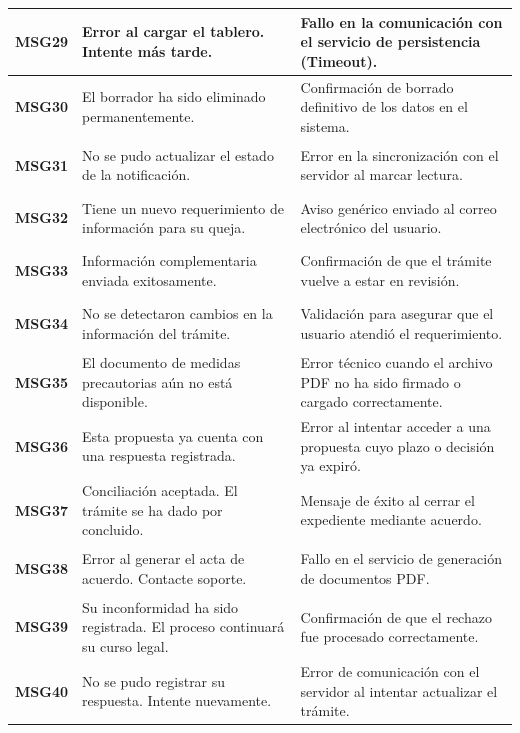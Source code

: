 \begin{longtable}{|p{2cm}|p{6cm}|p{6cm}|}
    \hypertarget{msg:MSG29}{\textbf{MSG29}} & Error al cargar el tablero. Intente más tarde. & Fallo en la comunicación con el servicio de persistencia (Timeout). \\ \hline
    \hypertarget{msg:MSG30}{\textbf{MSG30}} & El borrador ha sido eliminado permanentemente. & Confirmación de borrado definitivo de los datos en el sistema. \\ \hline
    \hypertarget{msg:MSG31}{\textbf{MSG31}} & No se pudo actualizar el estado de la notificación. & Error en la sincronización con el servidor al marcar lectura. \\ \hline
    \hypertarget{msg:MSG32}{\textbf{MSG32}} & Tiene un nuevo requerimiento de información para su queja. & Aviso genérico enviado al correo electrónico del usuario. \\ \hline
    \hypertarget{msg:MSG33}{\textbf{MSG33}} & Información complementaria enviada exitosamente. & Confirmación de que el trámite vuelve a estar en revisión. \\ \hline
    \hypertarget{msg:MSG34}{\textbf{MSG34}} & No se detectaron cambios en la información del trámite. & Validación para asegurar que el usuario atendió el requerimiento. \\ \hline
    \hypertarget{msg:MSG35}{\textbf{MSG35}} & El documento de medidas precautorias aún no está disponible. & Error técnico cuando el archivo PDF no ha sido firmado o cargado correctamente. \\ \hline
    \hypertarget{msg:MSG36}{\textbf{MSG36}} & Esta propuesta ya cuenta con una respuesta registrada. & Error al intentar acceder a una propuesta cuyo plazo o decisión ya expiró. \\ \hline
    \hypertarget{msg:MSG37}{\textbf{MSG37}} & Conciliación aceptada. El trámite se ha dado por concluido. & Mensaje de éxito al cerrar el expediente mediante acuerdo. \\ \hline
    \hypertarget{msg:MSG38}{\textbf{MSG38}} & Error al generar el acta de acuerdo. Contacte soporte. & Fallo en el servicio de generación de documentos PDF. \\ \hline
    \hypertarget{msg:MSG39}{\textbf{MSG39}} & Su inconformidad ha sido registrada. El proceso continuará su curso legal. & Confirmación de que el rechazo fue procesado correctamente. \\ \hline
    \hypertarget{msg:MSG40}{\textbf{MSG40}} & No se pudo registrar su respuesta. Intente nuevamente. & Error de comunicación con el servidor al intentar actualizar el trámite. \\ \hline

\end{longtable}
